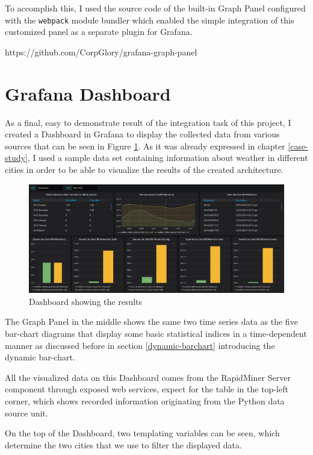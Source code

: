 To accomplish this, I used the source code of the built-in Graph Panel configured with the \texttt{webpack} module bundler which enabled the simple integration of this customized panel as a separate plugin for Grafana.

https://github.com/CorpGlory/grafana-graph-panel

\section{Grafana Dashboard} \label{final-dashboard}

As a final, easy to demonstrate result of the integration task of this project, I created a Dashboard in Grafana to display the collected data from various sources that can be seen in Figure \ref{fig:dashboard-final}. As it was already expressed in chapter \ref{case-study}, I used a sample data set containing information about weather in different cities in order to be able to visualize the results of the created architecture.

\begin{figure}[h]
	\centering
	\includegraphics[width=\linewidth, keepaspectratio]{figures/final-dashboard.png}
	\caption{Dashboard showing the results}
	\label{fig:dashboard-final}
\end{figure}

The Graph Panel in the middle shows the same two time series data as the five bar-chart diagrams that display some basic statistical indices in a time-dependent manner as discussed before in section \ref{dynamic-barchart} introducing the dynamic bar-chart.

All the visualized data on this Dashboard comes from the RapidMiner Server component through exposed web services, expect for the table in the top-left corner, which shows recorded information originating from the Python data source unit.

On the top of the Dashboard, two templating variables can be seen, which determine the two cities that we use to filter the displayed data.
